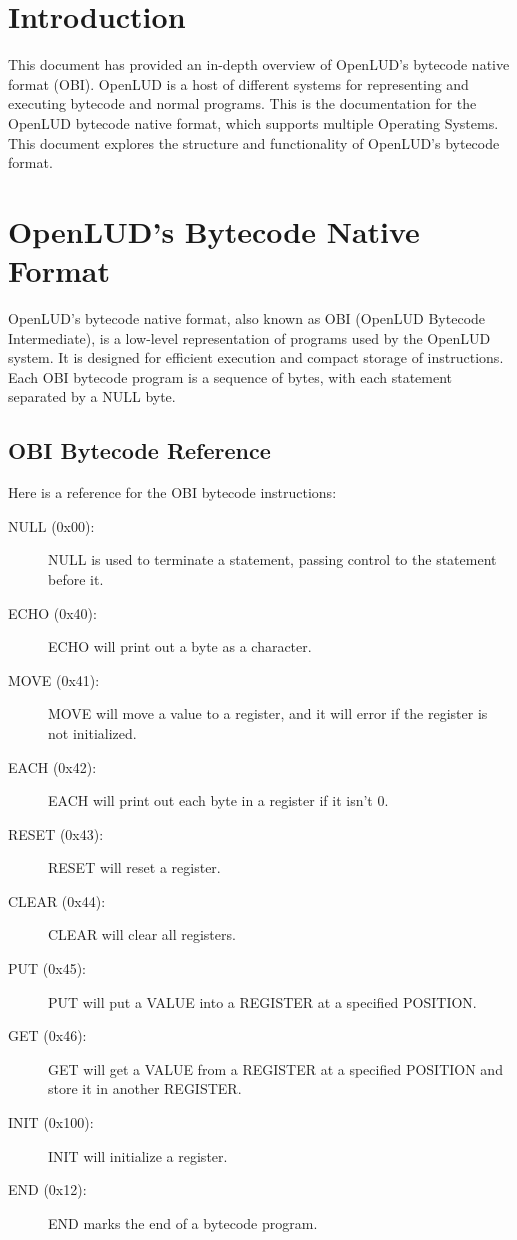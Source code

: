 \documentclass{article}
\begin{document}
\tableofcontents
\pagebreak


\section{Introduction}
This document has provided an in-depth overview of OpenLUD's bytecode native format (OBI). 
OpenLUD is a host of different systems for representing and executing bytecode
and normal programs. This is the documentation for the OpenLUD bytecode native
format, which supports multiple Operating Systems. This document explores the
structure and functionality of OpenLUD's bytecode format.

\pagebreak

\section{OpenLUD's Bytecode Native Format}

OpenLUD's bytecode native format, also known as OBI (OpenLUD Bytecode Intermediate), is a low-level representation of programs used by the OpenLUD system. It is designed for efficient execution and compact storage of instructions. Each OBI bytecode program is a sequence of bytes, with each statement separated by a NULL byte.
\subsection{OBI Bytecode Reference}

Here is a reference for the OBI bytecode instructions:

\begin{description}
  \item[NULL (0x00):] NULL is used to terminate a statement, passing control to the statement before it.
  \item[ECHO (0x40):] ECHO will print out a byte as a character.
  \item[MOVE (0x41):] MOVE will move a value to a register, and it will error if the register is not initialized.
  \item[EACH (0x42):] EACH will print out each byte in a register if it isn't 0.
  \item[RESET (0x43):] RESET will reset a register.
  \item[CLEAR (0x44):] CLEAR will clear all registers.
  \item[PUT (0x45):] PUT will put a VALUE into a REGISTER at a specified POSITION.
  \item[GET (0x46):] GET will get a VALUE from a REGISTER at a specified POSITION and store it in another REGISTER.
  \item[INIT (0x100):] INIT will initialize a register.
  \item[END (0x12):] END marks the end of a bytecode program.
\end{description}
\end{document}
